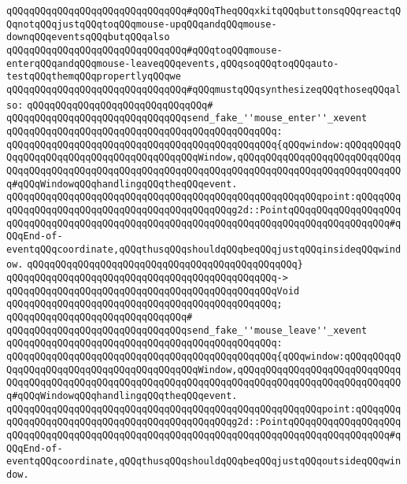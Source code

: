 \newline
\verb|qQQqqQQqqQQqqQQqqQQqqQQqqQQqqQQq#qQQqTheqQQqxkitqQQqbuttonsqQQqreactqQQqnotqQQqjustqQQqtoqQQqmouse-upqQQqandqQQqmouse-downqQQqeventsqQQqbutqQQqalso|\newline
\verb|qQQqqQQqqQQqqQQqqQQqqQQqqQQqqQQq#qQQqtoqQQqmouse-enterqQQqandqQQqmouse-leaveqQQqevents,qQQqsoqQQqtoqQQqauto-testqQQqthemqQQqpropertlyqQQqwe|\newline
\verb|qQQqqQQqqQQqqQQqqQQqqQQqqQQqqQQq#qQQqmustqQQqsynthesizeqQQqthoseqQQqalso:|\newline
\verb|qQQqqQQqqQQqqQQqqQQqqQQqqQQqqQQq#|\newline
\verb|qQQqqQQqqQQqqQQqqQQqqQQqqQQqqQQqsend_fake_''mouse_enter''_xevent|\newline
\verb|qQQqqQQqqQQqqQQqqQQqqQQqqQQqqQQqqQQqqQQqqQQqqQQq:|\newline
\verb|qQQqqQQqqQQqqQQqqQQqqQQqqQQqqQQqqQQqqQQqqQQqqQQq{qQQqwindow:qQQqqQQqqQQqqQQqqQQqqQQqqQQqqQQqqQQqqQQqqQQqWindow,qQQqqQQqqQQqqQQqqQQqqQQqqQQqqQQqqQQqqQQqqQQqqQQqqQQqqQQqqQQqqQQqqQQqqQQqqQQqqQQqqQQqqQQqqQQqqQQqqQQq#qQQqWindowqQQqhandlingqQQqtheqQQqevent.|\newline
\verb|qQQqqQQqqQQqqQQqqQQqqQQqqQQqqQQqqQQqqQQqqQQqqQQqqQQqqQQqpoint:qQQqqQQqqQQqqQQqqQQqqQQqqQQqqQQqqQQqqQQqqQQqqQQqg2d::PointqQQqqQQqqQQqqQQqqQQqqQQqqQQqqQQqqQQqqQQqqQQqqQQqqQQqqQQqqQQqqQQqqQQqqQQqqQQqqQQqqQQqqQQq#qQQqEnd-of-eventqQQqcoordinate,qQQqthusqQQqshouldqQQqbeqQQqjustqQQqinsideqQQqwindow.|\newline
\verb|qQQqqQQqqQQqqQQqqQQqqQQqqQQqqQQqqQQqqQQqqQQqqQQq}|\newline
\verb|qQQqqQQqqQQqqQQqqQQqqQQqqQQqqQQqqQQqqQQqqQQqqQQq->|\newline
\verb|qQQqqQQqqQQqqQQqqQQqqQQqqQQqqQQqqQQqqQQqqQQqqQQqVoid|\newline
\verb|qQQqqQQqqQQqqQQqqQQqqQQqqQQqqQQqqQQqqQQqqQQqqQQq;|\newline
\verb|qQQqqQQqqQQqqQQqqQQqqQQqqQQqqQQq#|\newline
\verb|qQQqqQQqqQQqqQQqqQQqqQQqqQQqqQQqsend_fake_''mouse_leave''_xevent|\newline
\verb|qQQqqQQqqQQqqQQqqQQqqQQqqQQqqQQqqQQqqQQqqQQqqQQq:|\newline
\verb|qQQqqQQqqQQqqQQqqQQqqQQqqQQqqQQqqQQqqQQqqQQqqQQq{qQQqwindow:qQQqqQQqqQQqqQQqqQQqqQQqqQQqqQQqqQQqqQQqqQQqWindow,qQQqqQQqqQQqqQQqqQQqqQQqqQQqqQQqqQQqqQQqqQQqqQQqqQQqqQQqqQQqqQQqqQQqqQQqqQQqqQQqqQQqqQQqqQQqqQQqqQQq#qQQqWindowqQQqhandlingqQQqtheqQQqevent.|\newline
\verb|qQQqqQQqqQQqqQQqqQQqqQQqqQQqqQQqqQQqqQQqqQQqqQQqqQQqqQQqpoint:qQQqqQQqqQQqqQQqqQQqqQQqqQQqqQQqqQQqqQQqqQQqqQQqg2d::PointqQQqqQQqqQQqqQQqqQQqqQQqqQQqqQQqqQQqqQQqqQQqqQQqqQQqqQQqqQQqqQQqqQQqqQQqqQQqqQQqqQQqqQQq#qQQqEnd-of-eventqQQqcoordinate,qQQqthusqQQqshouldqQQqbeqQQqjustqQQqoutsideqQQqwindow.|\newline
